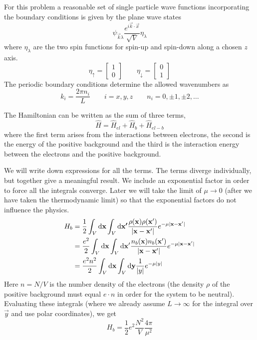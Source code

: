 For this problem a reasonable set of single particle wave functions incorporating the boundary conditions is given by the plane wave states
\[ \psi_{\vec{k}\lambda}\frac{e^{i \vec{k}\cdot \vec{x}}}{\sqrt{V}}\eta_\lambda \]
where $\eta_\lambda$ are the two spin functions for spin-up and spin-down along a chosen $z$ axis.
\[ \eta_\uparrow = \begin{bmatrix}
1\\0
\end{bmatrix} \qquad \eta_\downarrow = \begin{bmatrix}
0 \\ 1
\end{bmatrix}\]
The periodic boundary conditions determine the allowed wavenumbers as
\[ k_i = \frac{2\pi n_i}{L} \qquad i=x,y,z \qquad n_i = 0, \pm 1, \pm 2, \ldots \]

The Hamiltonian can be written as the sum of three terms,
\[\hat{H} = \hat{H}_{el} + \hat{H}_b + \hat{H}_{el-b}\]
where the first term arises from the interactions between electrons, the second is the energy of the positive background and the third is the interaction energy between the electrons and the positive background.

We will write down expressions for all the terms. The terms diverge individually, but together give a meaningful result. We include an exponential factor in order to force all the integrals converge. Later we will take the limit of $\mu \to 0$ (after we have taken the thermodynamic limit) so that the exponential factors do not influence the physics.
\begin{align*}
H_b &= \frac{1}{2}\int_V \operatorname{d \!}{\bm{\mathrm{x}}}\int_V \operatorname{d \!}{\bm{\mathrm{x'}}} \frac{\rho(\bm{\mathrm{x}})\rho(\bm{\mathrm{x}}')}{|\bm{\mathrm{x}}- \bm{\mathrm{x}}'|}e^{-\mu |\bm{\mathrm{x}}- \bm{\mathrm{x}}'|} \\
&= \frac{e^2}{2}\int_V \operatorname{d \!}{\bm{\mathrm{x}}}\int_V \operatorname{d \!}{\bm{\mathrm{x}}'} \frac{n_b(\bm{\mathrm{x}})n_b(\bm{\mathrm{x}}')}{|\bm{\mathrm{x}}- \bm{\mathrm{x}}'|}e^{-\mu |\bm{\mathrm{x}}- \bm{\mathrm{x}}'|} \\
&= \frac{e^2n^2}{2}\int_V \operatorname{d \!}{\bm{\mathrm{x}}}\int_V \operatorname{d \!}{\bm{\mathrm{y}}} \frac{1}{|y|}e^{-\mu |y|} \\
\end{align*}
Here $n = N/V$ is the number density of the electrons (the density $\rho$ of the positive background must equal $e \cdot n$ in order for the system to be neutral). Evaluating these integrals (where we already assume $L \to \infty$ for the integral over $\vec{y}$ and use polar coordinates), we get
\[H_b = \frac{1}{2}e^2 \frac{N^2}{V}\frac{4\pi}{\mu^2}\]

